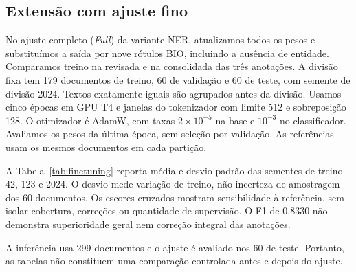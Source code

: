 \subsection{Extensão com ajuste fino}

No ajuste completo (\textit{Full}) da variante NER, atualizamos todos os pesos e substituímos a saída por nove rótulos BIO, incluindo a ausência de entidade. Comparamos treino na revisada e na consolidada das três anotações. A divisão fixa tem 179 documentos de treino, 60 de validação e 60 de teste, com semente de divisão 2024. Textos exatamente iguais são agrupados antes da divisão. Usamos cinco épocas em GPU T4 e janelas do tokenizador com limite 512 e sobreposição 128. O otimizador é AdamW, com taxas $2\times10^{-5}$ na base e $10^{-3}$ no classificador. Avaliamos os pesos da última época, sem seleção por validação. As referências usam os mesmos documentos em cada partição.



A Tabela~\ref{tab:finetuning} reporta média e desvio padrão das sementes de treino 42, 123 e 2024. O desvio mede variação de treino, não incerteza de amostragem dos 60 documentos. Os escores cruzados mostram sensibilidade à referência, sem isolar cobertura, correções ou quantidade de supervisão. O F1 de 0,8330 não demonstra superioridade geral nem correção integral das anotações.

A inferência usa 299 documentos e o ajuste é avaliado nos 60 de teste. Portanto, as tabelas não constituem uma comparação controlada antes e depois do ajuste.
